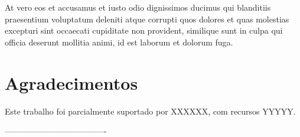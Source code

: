\documentclass[a0,portrait]{a0poster}
\begin{document}
\begin{mdframed}[style=MyFrame]
\begin{multicols}{2}
At vero eos et accusamus et iusto odio dignissimos ducimus qui blanditiis praesentium voluptatum deleniti atque corrupti quos dolores et quas molestias excepturi sint occaecati cupiditate non provident, similique sunt in culpa qui officia deserunt mollitia animi, id est laborum et dolorum fuga.

\section*{Agradecimentos}
%
Este trabalho foi parcialmente suportado por XXXXXX, com recursos  YYYYY.

%
%

-------------------------------------
\end{multicols}
\begin{center}
\end{center}
\end{mdframed}
\end{document}
